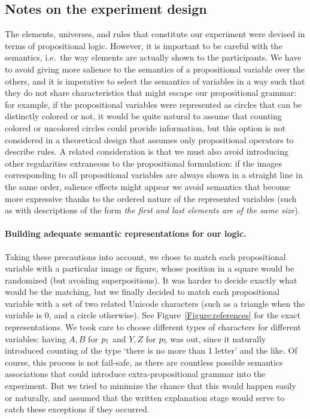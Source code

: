 

\subsection{Notes on the experiment design}\label{Experiment_design}

The elements, universes, and rules that constitute our experiment were devised in terms of propositional logic. However, it is important to be careful with the semantics, i.e.\ the way elements are actually shown to the participants. We have to avoid giving more salience to the semantics of a propositional variable over the others, and it is imperative to select the semantics of variables in a way such that they do not share characteristics that might escape our propositional grammar: for example, if the propositional variables were represented as circles that can be distinctly colored or not, it would be quite natural to assume that counting colored or uncolored circles could provide information, but this option is not considered in a theoretical design that assumes only propositional operators to describe rules. A related consideration is that we must also avoid introducing other regularities extraneous to the propositional formulation: if the images corresponding to all propositional variables are always shown in a straight line in the same order, salience effects might appear  we avoid semantics that become more expressive thanks to the ordered nature of the represented variables (such as with descriptions of the form {\em the first and last elements are of the same size}).%

\paragraph{Building adequate semantic representations for our logic.}
Taking these precautions into account, we chose to match each propositional variable with a particular image or figure, whose position in a square would be randomized (but avoiding superpositions). It was harder to decide exactly what would be the matching, but we finally decided to match each propositional variable with a set of two related Unicode characters (such as a triangle when the variable is $0$, and a circle otherwise). See Figure~\ref{Figure:references} for the exact representations. We took care to choose different types of characters for different variables: having $A,B$ for $p_1$ and $Y,Z$ for $p_5$ was out, since it naturally introduced counting of the type `there is no more than 1 letter' and the like.
Of course, this process is not fail-safe, as there are countless possible semantics associations that could introduce extra-propositional grammar into the experiment. But we tried to minimize the chance that this would happen easily or naturally, and assumed that the written explanation stage would serve to catch these exceptions if they occurred.

